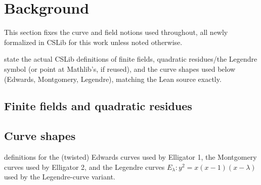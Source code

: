 \section{Background}
\label{sec:background}

This section fixes the curve and field notions used throughout, all
newly formalized in CSLib for this work unless noted otherwise.

state the actual CSLib definitions of finite fields,
quadratic residues/the Legendre symbol (or point at Mathlib's, if
reused), and the curve shapes used below (Edwards, Montgomery,
Legendre), matching the Lean source exactly.

\subsection{Finite fields and quadratic residues}
\label{subsec:fields}

\subsection{Curve shapes}
\label{subsec:curve-shapes}

definitions for the (twisted) Edwards curves used by
Elligator 1, the Montgomery curves used by Elligator 2, and the
Legendre curves $E_\lambda : y^2 = x(x-1)(x-\lambda)$ used by the
Legendre-curve variant.

